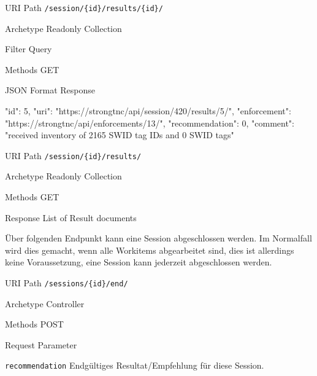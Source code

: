 \begin{mdframed}[style=def]
\begin{description*}
	\item[URI Path] \texttt{/session/\{id\}/results/\{id\}/}
	\item[Archetype] Readonly Collection
	\item[Filter Query] \hfill
	\item[Methods] GET
	\item[JSON Format Response] \hfill
\begin{jsoncode}
{
	"id": 5,
	"uri": "https://strongtnc/api/session/420/results/5/",
	"enforcement": "https://strongtnc/api/enforcements/13/",
	"recommendation": 0,	 
	"comment": "received inventory of 2165 SWID tag IDs and 0 SWID tags"
}
\end{jsoncode}
\end{description*}
\end{mdframed}

\begin{mdframed}[style=def]
\begin{description*}
	\item[URI Path] \texttt{/session/\{id\}/results/}
	\item[Archetype] Readonly Collection
	\item[Methods] GET
	\item[Response] List of Result documents
\end{description*}
\end{mdframed}

Über folgenden Endpunkt kann eine Session abgeschlossen werden. Im Normalfall
wird dies gemacht, wenn alle Workitems abgearbeitet sind, dies ist allerdings
keine Voraussetzung, eine Session kann jederzeit abgeschlossen werden.

\begin{mdframed}[style=def]
\begin{description*}
	\item[URI Path] \texttt{/sessions/\{id\}/end/}
	\item[Archetype] Controller
	\item[Methods] POST
	\item[Request Parameter] \hfill
	\begin{description*}
		\item[\texttt{recommendation}] Endgültiges Resultat/Empfehlung für diese
		Session.
	\end{description*}
\end{description*}
\end{mdframed}

